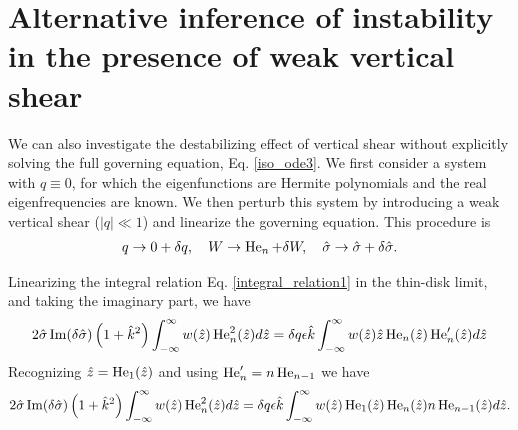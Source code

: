 \section{Alternative inference of instability in the presence of weak
  vertical shear}\label{pert_theory}
We can also investigate the destabilizing effect of vertical shear
without explicitly solving the full governing equation,
Eq. \ref{iso_ode3}. We first
consider a system with $q\equiv0$, for which the eigenfunctions are
Hermite polynomials and the real eigenfrequencies are known. We then
perturb this system by introducing a weak vertical shear ($|q|\ll1$)
and linearize the governing equation. This procedure is
\begin{align}   
  q \to 0 + \delta q,\quad
  W \to \operatorname{He}_n + \delta W,\quad
  \hat{\sigma} \to \hat{\sigma} + \delta\hat{\sigma}. 
\end{align}

Linearizing the integral relation Eq. \ref{integral_relation1} in the
thin-disk limit, and taking the
imaginary part, we have
\begin{align}
  2\hat{\sigma}\operatorname{Im}(\delta\hat{\sigma})
  \left(1+\hat{k}^2\right) \int_{-\infty}^{\infty} w(\hat{z})
  \operatorname{He}_n^2(\hat{z}) d\hat{z}
  = \delta q \epsilon \hat{k} 
  \int_{-\infty}^{\infty}
  w(\hat{z})\hat{z}\operatorname{He}_n(\hat{z})\operatorname{He}_n^\prime(\hat{z}) d\hat{z}
\end{align}
Recognizing $\hat{z} = \operatorname{He}_1(\hat{z})$ and using $\operatorname{He}_n^\prime = n
\operatorname{He}_{n-1}$ we have
 \begin{align}
   2\hat{\sigma}\operatorname{Im}(\delta\hat{\sigma})
   \left(1+\hat{k}^2\right) \int_{-\infty}^{\infty} w(\hat{z})
   \operatorname{He}_n^2(\hat{z}) d\hat{z}
   =\delta q \epsilon \hat{k} 
   \int_{-\infty}^{\infty}
   w(\hat{z})\operatorname{He}_1(\hat{z})\operatorname{He}_n(\hat{z})n\operatorname{He}_{n-1}(\hat{z})d\hat{z}. 
 \end{align}

